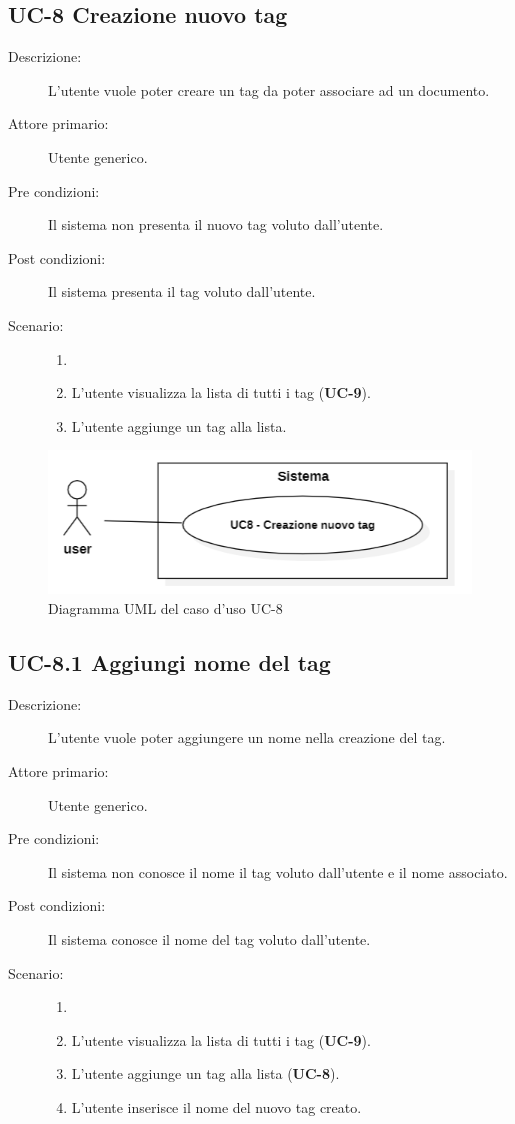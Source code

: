 \subsection{UC-8 Creazione nuovo tag}
\begin{description}
    \item[Descrizione:] L’utente vuole poter creare un tag da poter associare ad un documento.
    \item[Attore primario:] Utente generico.
    \item[Pre condizioni:] Il sistema non presenta il nuovo tag voluto dall’utente.
    \item[Post condizioni:] Il sistema presenta il tag voluto dall’utente.
    \item[Scenario:]
    \begin{enumerate}
        \item[]
        \item L’utente visualizza la lista di tutti i tag (\textbf{UC-9}).
        \item L'utente aggiunge un tag alla lista.
    \end{enumerate}
\end{description}

\begin{figure}[H]
    \centering
    \includegraphics[width=0.8\linewidth]{UC8.png} 
    \caption{Diagramma UML del caso d'uso UC-8}
    \label{fig:UC8}
\end{figure}

\subsection{UC-8.1 Aggiungi nome del tag}
\begin{description}
    \item[Descrizione:] L’utente vuole poter aggiungere un nome nella creazione del tag.
    \item[Attore primario:] Utente generico.
    \item[Pre condizioni:] Il sistema non conosce il nome  il tag voluto dall’utente e il nome associato.
    \item[Post condizioni:] Il sistema conosce il nome del tag voluto dall’utente.
    \item[Scenario:]
    \begin{enumerate}
        \item[]
        \item L’utente visualizza la lista di tutti i tag (\textbf{UC-9}).
        \item L'utente aggiunge un tag alla lista (\textbf{UC-8}).
        \item L'utente inserisce il nome del nuovo tag creato.
    \end{enumerate}
\end{description}

